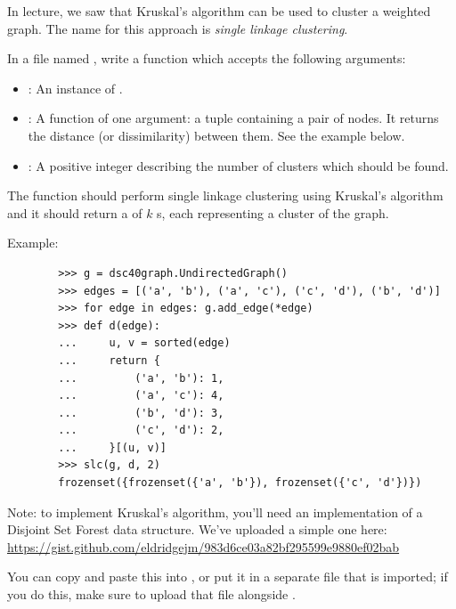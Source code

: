 \begin{progprob}
    In lecture, we saw that Kruskal's algorithm can be used to cluster a weighted graph. The name for this approach is
    \emph{single linkage clustering}.

    In a file named , write a function 
    which accepts the following arguments:
    \begin{itemize}
        \item {}: An instance of .
        \item {}: A function of one argument: a tuple containing a pair of nodes. It returns
            the distance (or dissimilarity) between them. See the example below.
        \item {}: A positive integer describing the number of clusters which should
            be found.
    \end{itemize}
    The function should perform single linkage clustering using Kruskal's algorithm
    and it should return a  of $k$ s, each
    representing a cluster of the graph.

    Example:

    \begin{verbatim}
        >>> g = dsc40graph.UndirectedGraph()
        >>> edges = [('a', 'b'), ('a', 'c'), ('c', 'd'), ('b', 'd')]
        >>> for edge in edges: g.add_edge(*edge)
        >>> def d(edge):
        ...     u, v = sorted(edge)
        ...     return {
        ...         ('a', 'b'): 1,
        ...         ('a', 'c'): 4,
        ...         ('b', 'd'): 3,
        ...         ('c', 'd'): 2,
        ...     }[(u, v)]
        >>> slc(g, d, 2)
        frozenset({frozenset({'a', 'b'}), frozenset({'c', 'd'})})
    \end{verbatim}

    Note: to implement Kruskal's algorithm, you'll need an implementation of a Disjoint
    Set Forest data structure. We've uploaded a simple one here:
    \url{https://gist.github.com/eldridgejm/983d6ce03a82bf295599e9880ef02bab}

    You can copy and paste this into , or put it in a separate file that
    is imported; if you do this, make sure to upload that file alongside .

    \begin{soln}
    	\inputminted{python}{\thisdir/include-solution/slc_sol.py}
    \end{soln}
\end{progprob}
